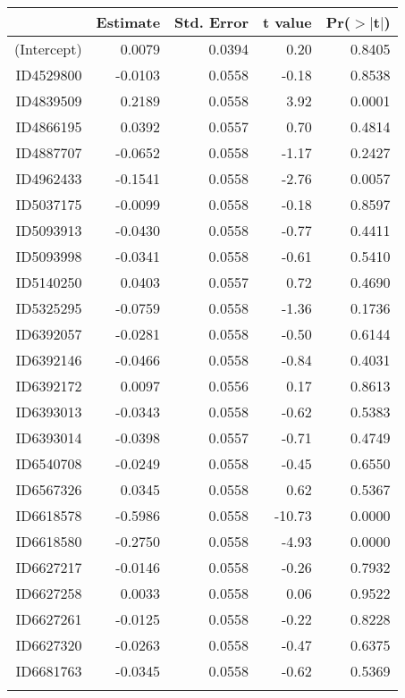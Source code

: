 \begin{table}[ht]
\centering
\begin{tabular}{rrrrr}
  \hline
 & Estimate & Std. Error & t value & Pr($>$$|$t$|$) \\ 
  \hline
(Intercept) & 0.0079 & 0.0394 & 0.20 & 0.8405 \\ 
  ID4529800 & -0.0103 & 0.0558 & -0.18 & 0.8538 \\ 
  ID4839509 & 0.2189 & 0.0558 & 3.92 & 0.0001 \\ 
  ID4866195 & 0.0392 & 0.0557 & 0.70 & 0.4814 \\ 
  ID4887707 & -0.0652 & 0.0558 & -1.17 & 0.2427 \\ 
  ID4962433 & -0.1541 & 0.0558 & -2.76 & 0.0057 \\ 
  ID5037175 & -0.0099 & 0.0558 & -0.18 & 0.8597 \\ 
  ID5093913 & -0.0430 & 0.0558 & -0.77 & 0.4411 \\ 
  ID5093998 & -0.0341 & 0.0558 & -0.61 & 0.5410 \\ 
  ID5140250 & 0.0403 & 0.0557 & 0.72 & 0.4690 \\ 
  ID5325295 & -0.0759 & 0.0558 & -1.36 & 0.1736 \\ 
  ID6392057 & -0.0281 & 0.0558 & -0.50 & 0.6144 \\ 
  ID6392146 & -0.0466 & 0.0558 & -0.84 & 0.4031 \\ 
  ID6392172 & 0.0097 & 0.0556 & 0.17 & 0.8613 \\ 
  ID6393013 & -0.0343 & 0.0558 & -0.62 & 0.5383 \\ 
  ID6393014 & -0.0398 & 0.0557 & -0.71 & 0.4749 \\ 
  ID6540708 & -0.0249 & 0.0558 & -0.45 & 0.6550 \\ 
  ID6567326 & 0.0345 & 0.0558 & 0.62 & 0.5367 \\ 
  ID6618578 & -0.5986 & 0.0558 & -10.73 & 0.0000 \\ 
  ID6618580 & -0.2750 & 0.0558 & -4.93 & 0.0000 \\ 
  ID6627217 & -0.0146 & 0.0558 & -0.26 & 0.7932 \\ 
  ID6627258 & 0.0033 & 0.0558 & 0.06 & 0.9522 \\ 
  ID6627261 & -0.0125 & 0.0558 & -0.22 & 0.8228 \\ 
  ID6627320 & -0.0263 & 0.0558 & -0.47 & 0.6375 \\ 
  ID6681763 & -0.0345 & 0.0558 & -0.62 & 0.5369 \\ 
$$
\end{tabular}
\end{table}
